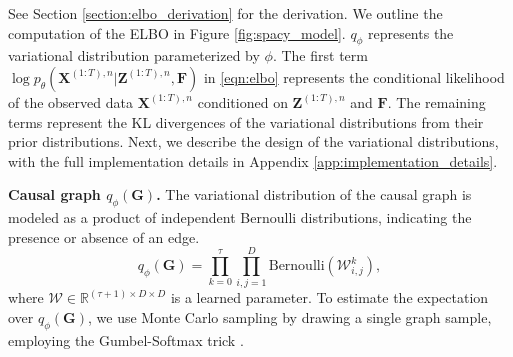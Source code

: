 See Section \ref{section:elbo_derivation} for the derivation. We outline the computation of the ELBO in Figure \ref{fig:spacy_model}. $q_\phi$ represents the variational distribution parameterized by $\phi$. The first term $\log p_{\theta}(\mathbf{X}^{(1:T), n} | \mathbf{Z}^{(1:T), n}, \mathbf{F})$ in \eqref{eqn:elbo} represents the conditional likelihood of the observed data $\mathbf{X}^{(1:T), n}$ conditioned on $\mathbf{Z}^{(1:T), n}$ and $\mathbf{F}$. The remaining terms represent the KL divergences of the variational distributions from their prior distributions.  Next, we describe the design of the variational distributions, with the full implementation details   in Appendix \ref{app:implementation_details}.

\textbf{Causal graph $q_\phi(\mathbf{G})$.} The variational distribution of the causal graph is modeled as a product of independent Bernoulli distributions, indicating the presence or absence of an edge.
\begin{equation*}
    q_\phi \left( \mathbf{G} \right) = \prod_{k=0}^{\tau} \prod_{i,j=1}^D \text{Bernoulli}\left( \mathcal{W}_{i, j}^{k} \right),
\end{equation*}
where $\mathcal{W} \in \mathbb{R}^{(\tau+1) \times D \times D}$ is a learned parameter.
To estimate the expectation over $q_\phi(\mathbf{G})$, we use Monte Carlo sampling by drawing a single graph sample, employing the Gumbel-Softmax trick \citep{jang2016categorical}. 

